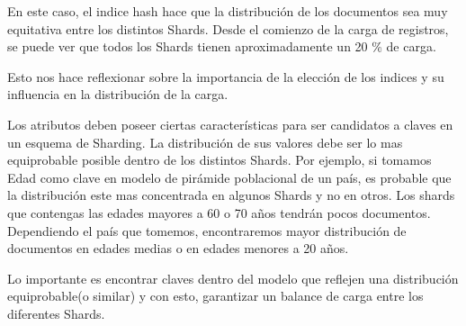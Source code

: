 En este caso, el indice hash hace que la distribución de los documentos sea muy equitativa entre los distintos Shards. Desde el comienzo de la carga de registros, se puede ver que todos los Shards tienen aproximadamente un 20 \% de carga.

Esto nos hace reflexionar sobre la importancia de la elección de los indices y su influencia en la distribución de la carga.

Los atributos deben poseer ciertas características para ser candidatos a claves en un esquema de Sharding. La distribución de sus valores debe ser lo mas equiprobable posible dentro de los distintos Shards. Por ejemplo, si tomamos Edad como clave en modelo de pirámide poblacional de un país, es probable que la distribución este mas concentrada en algunos Shards y no en otros. Los shards que contengas las edades mayores a 60 o 70 años tendrán pocos documentos. Dependiendo el país que tomemos, encontraremos mayor distribución de documentos en edades medias o en edades menores a 20 años.

Lo importante es encontrar claves dentro del modelo que reflejen una distribución equiprobable(o similar) y con esto, garantizar un balance de carga entre los diferentes Shards.



